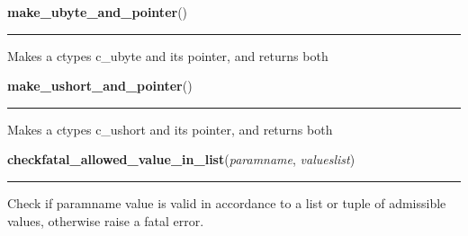     \label{xformslib:library:make_ubyte_and_pointer}

    \vspace{0.5ex}

\hspace{.8\funcindent}\begin{boxedminipage}{\funcwidth}

    \raggedright \textbf{make\_ubyte\_and\_pointer}()

    \vspace{-1.5ex}

    \rule{\textwidth}{0.5\fboxrule}
\setlength{\parskip}{2ex}

Makes a ctypes c\_ubyte and its pointer, and returns both
\setlength{\parskip}{1ex}
    \end{boxedminipage}

    \label{xformslib:library:make_ushort_and_pointer}

    \vspace{0.5ex}

\hspace{.8\funcindent}\begin{boxedminipage}{\funcwidth}

    \raggedright \textbf{make\_ushort\_and\_pointer}()

    \vspace{-1.5ex}

    \rule{\textwidth}{0.5\fboxrule}
\setlength{\parskip}{2ex}

Makes a ctypes c\_ushort and its pointer, and returns both
\setlength{\parskip}{1ex}
    \end{boxedminipage}

    \label{xformslib:library:checkfatal_allowed_value_in_list}

    \vspace{0.5ex}

\hspace{.8\funcindent}\begin{boxedminipage}{\funcwidth}

    \raggedright \textbf{checkfatal\_allowed\_value\_in\_list}(\textit{paramname}, \textit{valueslist})

    \vspace{-1.5ex}

    \rule{\textwidth}{0.5\fboxrule}
\setlength{\parskip}{2ex}

Check if paramname value is valid in accordance to a list or tuple
of admissible values, otherwise raise a fatal error.
\setlength{\parskip}{1ex}
    \end{boxedminipage}

